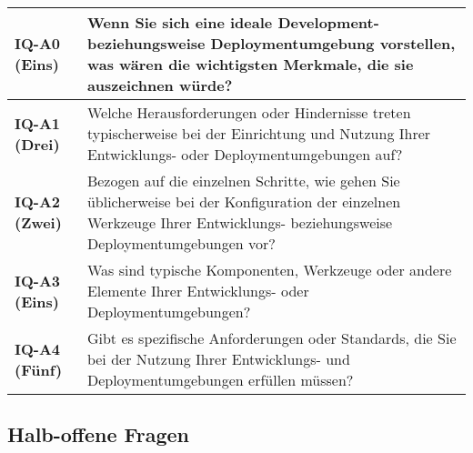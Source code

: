 \begin{table}[H]
    \centering
    \begin{tabular}{ >{\raggedright\bfseries}p{} p{} }
        IQ-A0 (Eins) & 
        Wenn Sie sich eine ideale Development- beziehungsweise Deploymentumgebung vorstellen, was wären die wichtigsten Merkmale, die sie auszeichnen würde? \\
        \hline
        IQ-A1 (Drei) &
        Welche Herausforderungen oder Hindernisse treten typischerweise bei der Einrichtung und Nutzung Ihrer Entwicklungs- oder Deploymentumgebungen auf? \\
        \hline
        IQ-A2 (Zwei) &
        Bezogen auf die einzelnen Schritte, wie gehen Sie üblicherweise bei der Konfiguration der einzelnen Werkzeuge Ihrer Entwicklungs- beziehungsweise Deploymentumgebungen vor? \\
        \hline
        IQ-A3 (Eins) &
        Was sind typische Komponenten, Werkzeuge oder andere Elemente Ihrer Entwicklungs- oder Deploymentumgebungen? \\
        \hline
        IQ-A4 (Fünf) &
        Gibt es spezifische Anforderungen oder Standards, die Sie bei der Nutzung Ihrer Entwicklungs- und Deploymentumgebungen erfüllen müssen? \\
    \end{tabular}
\end{table}

\clearpage

\subsection{Halb-offene Fragen}
\label{subsec:AA-01-02_half-open-questions}

